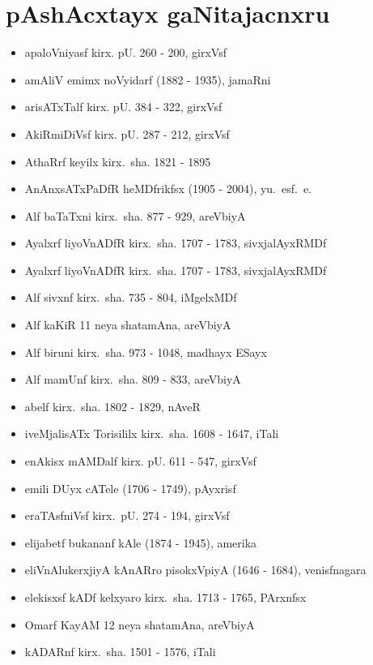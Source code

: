\newpage
\section*{pAshAcxtayx gaNitajacnxru}

{\renewcommand\labelitemi{}
\begin{itemize}
\item apaloVniyasf kirx. pU. {\rm 260 - 200}, girxVsf
\item amAliV emimx noVyidarf {\rm (1882 - 1935)}, jamaRni
\item arisATxTalf kirx. pU. {\rm 384 - 322}, girxVsf
\item AkiRmiDiVsf kirx. pU. {\rm 287 - 212}, girxVsf
\item AthaRrf keyilx kirx.~sha. {\rm 1821 - 1895}
\item AnAnxsATxPaDfR heMDfrikfsx {\rm (1905 - 2004)}, yu.~esf.~e.
\item Alf baTaTxni kirx.~sha. {\rm 877 - 929}, areVbiyA
\item Ayalxrf liyoVnADfR kirx.~sha. {\rm 1707 - 1783}, sivxjalAyxRMDf
\item Ayalxrf liyoVnADfR kirx.~sha. {\rm 1707 - 1783}, sivxjalAyxRMDf
\item Alf sivxnf kirx.~sha. {\rm 735 - 804}, iMgelxMDf
\item Alf kaKiR {\rm 11} neya shatamAna, areVbiyA
\item Alf biruni kirx.~sha. {\rm 973 - 1048}, madhayx ESayx
\item Alf mamUnf kirx.~sha. {\rm 809 - 833}, areVbiyA
\item abelf kirx.~sha. {\rm 1802 - 1829}, nAveR
\item iveMjalisATx Torisililx kirx.~sha. {\rm 1608 - 1647}, iTali
\item enAkisx mAMDalf kirx. pU. {\rm 611 - 547}, girxVsf
\item emili DUyx cATele {\rm (1706 - 1749)}, pAyxrisf
\item eraTAsfniVsf kirx.~pU. {\rm 274 - 194}, girxVsf
\item elijabetf bukananf kAle {\rm (1874 - 1945)}, amerika
\item eliVnAlukerxjiyA kAnARro pisokxVpiyA {\rm (1646 - 1684)}, venisfnagara
\item elekisxsf kADf kelxyaro kirx.~sha. {\rm 1713 - 1765}, PArxnfsx
\item Omarf KayAM {\rm 12} neya shatamAna, areVbiyA
\item kADARnf kirx.~sha. {\rm 1501 - 1576}, iTali

\end{itemize}}
